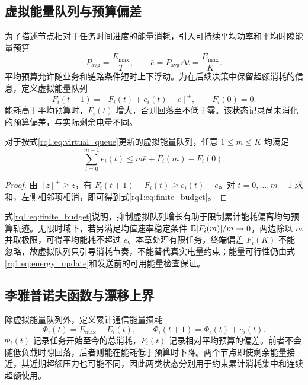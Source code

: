 \subsection{虚拟能量队列与预算偏差}

为了描述节点相对于任务时间进度的能量消耗，引入可持续平均功率和平均时隙能量预算
\begin{equation}
 P_{\mathrm{avg}}=\frac{E_{\max}}{T},\qquad
 \bar e=P_{\mathrm{avg}}\Delta t=\frac{E_{\max}}{K}.
 \label{rq1:eq:average_budget}
\end{equation}
平均预算允许随业务和链路条件短时上下浮动。为在后续决策中保留超额消耗的信息，定义虚拟能量队列
\begin{equation}
 F_i(t+1)=[F_i(t)+e_i(t)-\bar e]^+,\qquad F_i(0)=0.
 \label{rq1:eq:virtual_queue}
\end{equation}
能耗高于平均预算时，$F_i(t)$ 增大，否则回落至不低于零。该状态记录尚未消化的预算偏差，与实际剩余电量不同。

\begin{proposition}[虚拟队列的累计预算关系]
\label{rq1:prop:budget}
对于按式\eqref{rq1:eq:virtual_queue}更新的虚拟能量队列，任意 $1\le m\le K$ 均满足
\begin{equation}
 \sum_{t=0}^{m-1}e_i(t)\le m\bar e+F_i(m)-F_i(0).
 \label{rq1:eq:finite_budget}
\end{equation}
\end{proposition}
\begin{proof}
由 $[z]^+\ge z$，有 $F_i(t+1)-F_i(t)\ge e_i(t)-\bar e$。对 $t=0,\ldots,m-1$ 求和，左侧相邻项相消，即可得到式\eqref{rq1:eq:finite_budget}。
\end{proof}

式\eqref{rq1:eq:finite_budget}说明，抑制虚拟队列增长有助于限制累计能耗偏离均匀预算轨迹。无限时域下，若另满足均值速率稳定条件 $\mathbb{E}[F_i(m)]/m\to0$，两边除以 $m$ 并取极限，可得平均能耗不超过 $\bar e$。本章处理有限任务，终端偏差 $F_i(K)$ 不能忽略，故虚拟队列只引导消耗节奏，不能替代真实电量约束；能量可行性仍由式\eqref{rq1:eq:energy_update}和发送前的可用能量检查保证。

\subsection{李雅普诺夫函数与漂移上界}

除虚拟能量队列外，定义累计通信能量损耗
\begin{equation}
 \Phi_i(t)=E_{\max}-E_i(t),\qquad
 \Phi_i(t+1)=\Phi_i(t)+e_i(t).
 \label{rq1:eq:energy_deficit}
\end{equation}
$\Phi_i(t)$ 记录任务开始至今的总消耗，$F_i(t)$ 记录相对平均预算的偏差。前者不会随低负载时隙回落，后者则能在能耗低于预算时下降。两个节点即使剩余能量接近，其近期超额压力也可能不同，因此两类状态分别用于约束累计消耗集中和连续超额使用。

